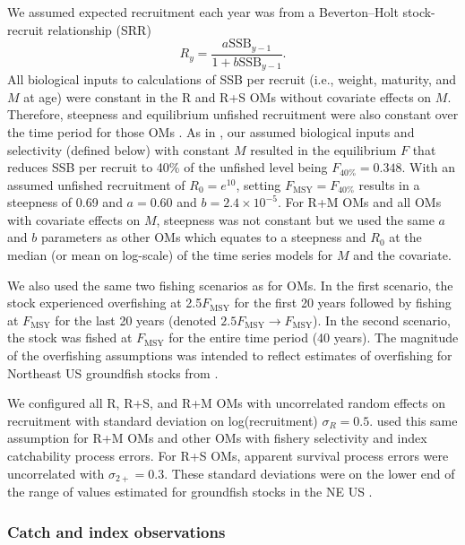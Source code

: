 \documentclass[
  12pt,
]{article}
\newcommand{\Fmsy}{\ensuremath{F_{\text{MSY}}}\xspace}
\begin{document}
We assumed expected recruitment each year was from a Beverton--Holt stock-recruit relationship (SRR)
\[
R_{y} = \frac{a \text{SSB}_{y-1}}{1 + b \text{SSB}_{y-1}}.
\]
All biological inputs to calculations of SSB per recruit (i.e., weight, maturity, and \(M\) at age) were constant in the R and R+S OMs without covariate effects on \(M\). Therefore, steepness and equilibrium unfished recruitment were also constant over the time period for those OMs \citep{millerbrooks21}. As in \citet{milleretal_inreview1}, our assumed biological inputs and selectivity (defined below) with constant \(M\) resulted in the equilibrium \(F\) that reduces SSB per recruit to 40\% of the unfished level being \(F_{40\%} = 0.348\). With an assumed unfished recruitment of \(R_0 = e^{10}\), setting \(\Fmsy = F_{40\%}\) results in a steepness of 0.69 and \(a=0.60\) and \(b = 2.4 \times 10^{-5}\). For R+M OMs and all OMs with covariate effects on \(M\), steepness was not constant but we used the same \(a\) and \(b\) parameters as other OMs which equates to a steepness and \(R_0\) at the median (or mean on log-scale) of the time series models for \(M\) and the covariate.

We also used the same two fishing scenarios as \citet{milleretal_inreview1} for OMs. In the first scenario, the stock experienced overfishing at 2.5\Fmsy for the first 20 years followed by fishing at \Fmsy for the last 20 years (denoted \(2.5\Fmsy \rightarrow \Fmsy\)). In the second scenario, the stock was fished at \Fmsy for the entire time period (40 years). The magnitude of the overfishing assumptions was intended to reflect estimates of overfishing for Northeast US groundfish stocks from \citet{wiedenmannetal19}.

We configured all R, R+S, and R+M OMs with uncorrelated random effects on recruitment with standard deviation on log(recruitment) \(\sigma_R = 0.5\). \citet{milleretal_inreview1} used this same assumption for R+M OMs and other OMs with fishery selectivity and index catchability process errors. For R+S OMs, apparent survival process errors were uncorrelated with \(\sigma_{2+} = 0.3\). These standard deviations were on the lower end of the range of values estimated for groundfish stocks in the NE US \citep[see Table S1 in][]{brittenetal26}.

\subsubsection*{Catch and index observations}\label{catch-and-index-observations}
\end{document}
